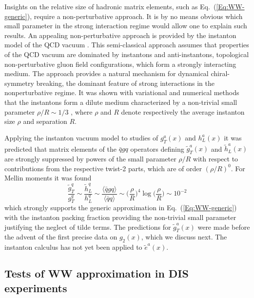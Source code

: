 \documentclass[a4paper,11pt]{article}
\newcommand{\be}{\begin{equation}}
\newcommand{\ee}{\end{equation}}
\newcommand{\la}{\langle}
\newcommand{\ra}{\rangle}
\begin{document}
Insights on the relative size of hadronic matrix elements, such as
Eq.~(\ref{Eq:WW-generic}), require a non-perturbative approach. It is
by no means obvious which small parameter in the strong interaction
regime would allow one to explain such results. An appealing
non-perturbative approach is provided by the instanton model of
the QCD vacuum \cite{Shuryak:1981ff,Diakonov:1983hh,Diakonov:1995qy}.
This semi-classical approach assumes that properties of the QCD vacuum
are dominated by instantons and anti-instantons, topological non-perturbative
gluon field configurations, which form a strongly interacting medium.
The approach provides a natural mechanism for dynamical chiral-symmetry
breaking, the dominant feature of strong interactions in the nonperturbative
regime. It was shown with variational and numerical methods that the
instantons form a dilute medium characterized by a non-trivial small parameter
$\rho/R\sim1/3$ \cite{Shuryak:1981ff,Diakonov:1983hh,Diakonov:1995qy},
where $\rho$ and $R$ denote respectively the average instanton size $\rho$
and separation $R$.

Applying the instanton vacuum model to studies of $g_T^a(x)$ and $h_L^a(x)$
it was predicted that matrix elements of the $\bar{q}gq$ operators defining
$\tilde{g}_T^a(x)$ \cite{Balla:1997hf} and $\tilde{h}_L^a(x)$
\cite{Dressler:1999hc} are strongly suppressed by powers of the small
parameter $\rho/R$ with respect to contributions from the
respective twist-2 parts, which are of order $(\rho/R)^0$.
For Mellin moments it was found \cite{Balla:1997hf,Dressler:1999hc}
\be\label{Eq:WW-instanoton}
	\frac{\tilde{g}_T^q}{g_T^q} \sim \frac{\tilde{h}_L^q}{h_L^q}
	\sim \frac{\la\bar{q}gq\ra}{\la\bar{q}q\ra} \sim
	\biggl(\frac{\rho}{R}\biggr)^{\!4} \log\biggl(\frac{\rho}{R}\biggr)
	\sim 10^{-2}
\ee
which strongly supports the generic approximation
in Eq.~(\ref{Eq:WW-generic}) with the instanton packing fraction providing
the non-trivial small parameter justifying the neglect of tilde terms.
The predictions for $\tilde{g}_T^a(x)$ \cite{Balla:1997hf}
were made before the advent of the first precise data on $g_2(x)$,
which we discuss next.
The instanton calculus has not yet been applied to $\tilde{e}^a(x)$.


%
\subsection{Tests of WW approximation in DIS experiments}
\label{Sec-3.4:WW-classic-experiment}
\end{document}
